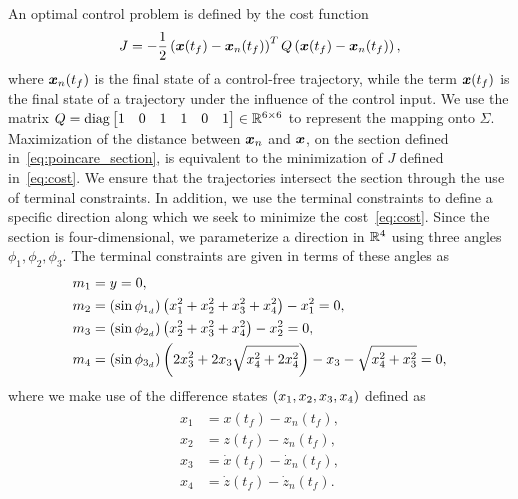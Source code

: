 \documentclass[]{aiaa-tc}%
\begin{document}
An optimal control problem is defined by the cost function
\begin{align}\label{eq:cost}
    J = -\frac{1}{2} \left( \bm{x}(t_f) - \bm{x}_{n}(t_f)\right)^T 
    Q
    \left( \bm{x}(t_f) - \bm{x}_{n}(t_f)\right) ,
\end{align}
where \( \bm{x}_n(t_f) \) is the final state of a control-free trajectory, while the term \( \bm{x}(t_f)\) is the final state of a trajectory under the influence of the control input.
We use the matrix \( Q = \text{diag} \begin{bmatrix} 1 & 0 & 1 & 1 & 0 &1 \end{bmatrix} \in \mathbb{R}^{6 \times 6}\) to represent the mapping onto \( \Sigma \).
Maximization of the distance between \( \bm{x}_n \) and \(\bm{x} \), on the \Poincare section defined in~\cref{eq:poincare_section}, is equivalent to the minimization of \( J \) defined in~\cref{eq:cost}.
We ensure that the trajectories intersect the \Poincare section through the use of terminal constraints.
In addition, we use the terminal constraints to define a specific direction along which we seek to minimize the cost~\cref{eq:cost}.
Since the \Poincare section is four-dimensional, we parameterize a direction in \( \mathbb{R}^4 \)  using three angles \( \phi_1, \phi_2 , \phi_3 \).
The terminal constraints are given in terms of these angles as
\begin{align}\label{eq:terminal_constraints}
    \begin{split}
        m_1 &= y = 0 , \\
        m_2 &= \left( \sin \phi_{1_{d}} \right) \left(  x_1^2 + x_2^2 + x_3^2 + x_4^2 \right) - x_1^2 = 0, \\
        m_3 &= \left( \sin \phi_{2_{d}} \right) \left(  x_2^2 + x_3^2 + x_4^2 \right) - x_2^2 = 0, \\
        m_4 &= \left( \sin \phi_{3_{d}} \right) \left(  2 x_3^2 + 2 x_3 \sqrt{x_4^2 + 2 x_4^2} \right) - x_3 - \sqrt{x_4^2 + x_3^2} = 0 ,
    \end{split}
\end{align}
where we make use of the difference states \( \left( x_1, x_2 ,x_3, x_4  \right)\) defined as
\begin{align}\label{eq:diff_states}
    \begin{split}
        x_1 &= x(t_f) - x_n(t_f) , \\
        x_2 &= z(t_f) - z_n(t_f) , \\
        x_3 &= \dot{x}(t_f) - \dot{x}_n(t_f) , \\
        x_4 &= \dot{z}(t_f) - \dot{z}_n(t_f) . \\
    \end{split}
\end{align}
\end{document}
